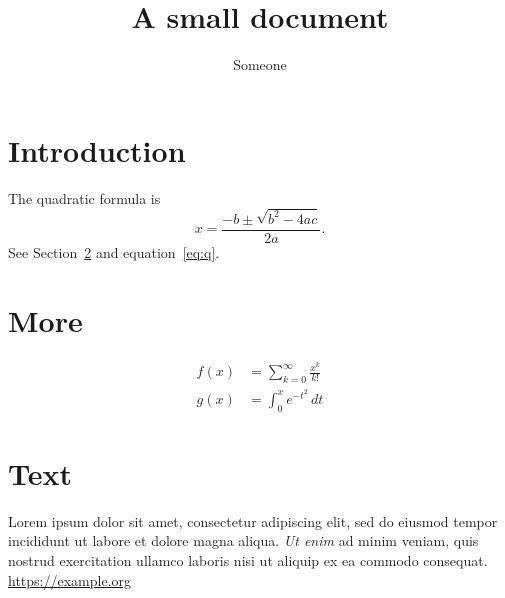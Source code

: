 \documentclass{article}
\begin{document}
\title{A small document}\author{Someone}\maketitle
\tableofcontents
\section{Introduction}\label{sec:intro}
The quadratic formula is
\begin{equation}\label{eq:q}
  x = \frac{-b \pm \sqrt{b^2 - 4ac}}{2a}.
\end{equation}
See Section~\ref{sec:more} and equation~\eqref{eq:q}.
\section{More}\label{sec:more}
\begin{align}
  f(x) &= \sum_{k=0}^{\infty} \frac{x^k}{k!} \\
  g(x) &= \int_0^x e^{-t^2}\,dt
\end{align}
\begin{center}
\end{center}
\section{Text}
Lorem ipsum dolor sit amet, consectetur adipiscing elit, sed do eiusmod
tempor incididunt ut labore et dolore magna aliqua. \emph{Ut enim} ad minim
veniam, quis nostrud exercitation ullamco laboris nisi ut aliquip ex ea
commodo consequat. \url{https://example.org}
\end{document}
